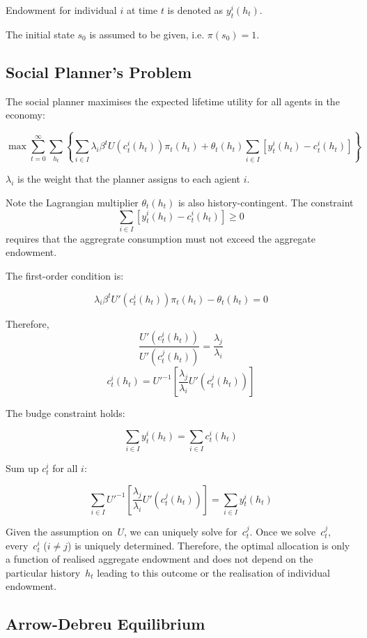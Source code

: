 \documentclass[10pt,a4]{article}
\begin{document}
Endowment for individual $i$ at time $t$ is denoted as $y_t^i(h_t)$. 

The initial state $s_0$ is assumed to be given, i.e. $\pi(s_0)=1$.

\subsection{Social Planner's Problem}

{\label{864866}}

The social planner maximises the expected lifetime utility for all agents in the economy:

$$\max \sum_{t=0}^{\infty}\sum_{h_t}\left\{\sum_{i\in I}\lambda_i\beta^tU(c_t^i(h_t))\pi_t(h_t) + \theta_t(h_t)\sum_{i\in I}[y_t^i(h_t)-c_t^i(h_t)]\right\}$$

$\lambda_i$ is the weight that the planner assigns to each agient $i$. 

Note the Lagrangian multiplier $\theta_t(h_t)$ is also history-contingent. The constraint $$\sum_{i\in I}[y_t^i(h_t)-c_t^i(h_t)]\ge 0$$ requires that the aggregrate consumption must not exceed the aggregate endowment.



The first-order condition is:

$$ \lambda_i \beta^t U'(c_t^i(h_t)) \pi_t(h_t) - \theta_t(h_t) = 0 $$

Therefore, 
$$ \frac{U'(c_t^i(h_t))}{U'(c_t^j(h_t))} =\frac{\lambda_j}{\lambda_i} $$
$$ c_t^i(h_t) = U'^{-1}\left[\frac{\lambda_j}{\lambda_i}U'(c_t^j(h_t))\right] $$

The budge constraint holds:

$$ \sum_{i\in I} y_t^i(h_t) = \sum_{i\in I} c_t^i(h_t) $$

Sum up $c_t^i$ for all $i$:

$$ \sum_{i\in I} U'^{-1}\left[\frac{\lambda_j}{\lambda_i}U'(c_t^j(h_t))\right] = \sum_{i\in I} y_t^i(h_t) $$

Given the assumption on~\(U\), we can uniquely solve
for~\(c_t^j\). Once we solve~\(c_t^j\),
every~\(c_t^i\) (\(i\neq j\)) is uniquely determined.
Therefore, the optimal allocation is only a function of realised
aggregate endowment and does not depend on the particular
history~\(h_t\) leading to this outcome or the realisation of
individual endowment.~

\par\null

\subsection{Arrow-Debreu Equilibrium}
\end{document}
